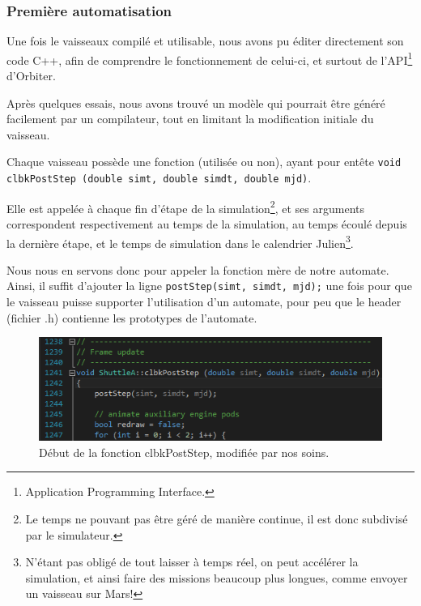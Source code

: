 \documentclass[a4paper,11pt]{article}
\begin{document}
    \subsubsection{Première automatisation}
        Une fois le vaisseaux compilé et utilisable, nous avons pu éditer directement son code C++, afin de comprendre le fonctionnement de celui-ci, et surtout de l'API\footnote{Application Programming Interface.} d'Orbiter.

        Après quelques essais, nous avons trouvé un modèle qui pourrait être généré facilement par un compilateur, tout en limitant la modification initiale du vaisseau.
        
        Chaque vaisseau possède une fonction (utilisée ou non), ayant pour entête \texttt{void clbkPostStep (double simt, double simdt, double mjd)}. 
        
        Elle est appelée à chaque fin d'étape de la simulation\footnote{Le temps ne pouvant pas être géré de manière continue, il est donc subdivisé par le simulateur.}, et ses arguments correspondent respectivement au temps de la simulation, au temps écoulé depuis la dernière étape, et le temps de simulation dans le calendrier Julien\footnote{N'étant pas obligé de tout laisser à temps réel, on peut accélérer la simulation, et ainsi faire des missions beaucoup plus longues, comme envoyer un vaisseau sur Mars!}.
        
        Nous nous en servons donc pour appeler la fonction \og mère\fg{} de notre automate. Ainsi, il suffit d'ajouter la ligne \texttt{postStep(simt, simdt, mjd);} une fois pour que le vaisseau puisse supporter l'utilisation d'un automate, pour peu que le header (fichier .h) contienne les prototypes de l'automate.

        \begin{figure}[!h]
            \begin{center}
                \includegraphics[width=1\textwidth]{img/post_step.png}
                \caption{Début de la fonction clbkPostStep, modifiée par nos soins.}
            \end{center}
        \end{figure}
        
\end{document}
